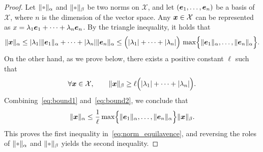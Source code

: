 \begin{proof}
    Let $\norm{\placeholder}_{\alpha}$ and $\norm{\placeholder}_{\beta}$ be two norms on $\mathcal X$,
    and let $(\mathbf{\boldsymbol{e}}_1, \dotsc, \mathbf{\boldsymbol{e}}_n)$ be a basis of $\mathcal X$,
    where $n$ is the dimension of the vector space.
    Any $\mathbf{\boldsymbol{x}} \in \mathcal X$ can be represented as $x = \lambda_1 \mathbf{\boldsymbol{e}}_1 + \dotsb + \lambda_n \mathbf{\boldsymbol{e}}_n$.
    By the triangle inequality,
    it holds that
    \begin{equation}
        \label{eq:bound1}
        \lVert\mathbf{\boldsymbol{x}}\rVert_{\alpha} \leq \lvert\lambda_1\rvert \lVert\mathbf{\boldsymbol{e}}_1\rVert_{\alpha} + \dotsb + \lvert\lambda_n\rvert \lVert\mathbf{\boldsymbol{e}}_n\rVert_{\alpha} \leq \Bigl(\lvert\lambda_1\rvert + \dotsb + \lvert\lambda_n\rvert\Bigr) \, \max \Bigl\{\lVert\mathbf{\boldsymbol{e}}_1\rVert_{\alpha}, \dotsc, \lVert\mathbf{\boldsymbol{e}}_n\rVert_{\alpha}\Bigr\}.
    \end{equation}
    On the other hand, as we prove below,
    there exists a positive constant $\ell$ such that
    \begin{equation}
        \label{eq:bound2}
        \forall \mathbf{\boldsymbol{x}} \in \mathcal X, \qquad
        \lVert\mathbf{\boldsymbol{x}}\rVert_{\beta}
        \geq \ell \Bigl( \lvert\lambda_1\rvert + \dotsb + \lvert\lambda_n\rvert \Bigr).
    \end{equation}
    Combining~\eqref{eq:bound1} and~\eqref{eq:bound2},
    we conclude that
    \[
        \lVert\mathbf{\boldsymbol{x}}\rVert_{\alpha} \leq \frac{1}{\ell} \max \Bigl\{\lVert\mathbf{\boldsymbol{e}}_1\rVert_{\alpha}, \dotsc, \lVert\mathbf{\boldsymbol{e}}_n\rVert_{\alpha}\Bigr\} \lVert\mathbf{\boldsymbol{x}}\rVert_{\beta}.
    \]
    This proves the first inequality in~\eqref{eq:norm_equilavence},
    and reversing the roles of $\norm{\placeholder}_{\alpha}$ and $\norm{\placeholder}_{\beta}$ yields the second inequality.


\end{proof}
